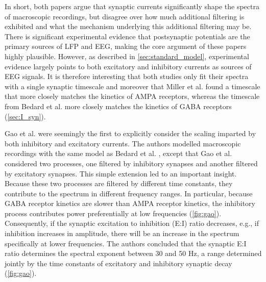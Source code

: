 In short, both papers argue that synaptic currents significantly shape the spectra of macroscopic recordings, but disagree over how much additional filtering is exhibited and what the mechanism underlying this additional filtering may be. There is significant experimental evidence that postsynaptic potentials are the primary sources of LFP and EEG, making the core argument of these papers highly plausible. However, as described in \autoref{sec:standard_model}, experimental evidence largely points to both excitatory and inhibitory currents as sources of EEG signals. It is therefore interesting that both studies only fit their spectra with a single synaptic timescale and moreover that Miller et al. \cite{Miller2009} found a timescale that more closely matches the kinetics of AMPA receptors, whereas the timescale from Bedard et al. \cite{Bedard2006} more closely matches the kinetics of GABA receptors (\autoref{sec:I_syn}).

Gao et al. \cite{Gao2017} were seemingly the first to explicitly consider the scaling imparted by both inhibitory and excitatory currents. The authors modelled macroscopic recordings with the same model as Bedard et al. \cite{Bedard2006}, except that Gao et al. considered two processes, one filtered by inhibitory synapses and another filtered by excitatory synapses. This simple extension led to an important insight. Because these two processes are filtered by different time constants, they contribute to the spectrum in different frequency ranges. In particular, because GABA receptor kinetics are slower than AMPA receptor kinetics, the inhibitory process contributes power preferentially at low frequencies (\autoref{fig:gao}). Consequently, if the synaptic excitation to inhibition (E:I) ratio decreases, e.g., if inhibition increases in amplitude, there will be an increase in the spectrum specifically at lower frequencies. The authors concluded that the synaptic E:I ratio determines the spectral exponent between 30 and 50 Hz, a range determined jointly by the time constants of excitatory and inhibitory synaptic decay (\autoref{fig:gao}).

